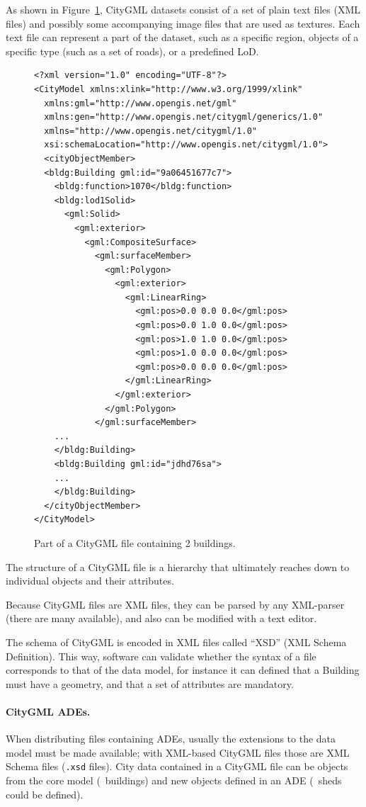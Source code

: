As shown in Figure~\ref{fig:citygml_file}, CityGML datasets consist of a set of plain text files (XML files) and possibly some accompanying image files that are used as textures. 
Each text file can represent a part of the dataset, such as a specific region, objects of a specific type (such as a set of roads), or a predefined LoD\@.
\begin{figure}
\begin{lstlisting}
<?xml version="1.0" encoding="UTF-8"?>
<CityModel xmlns:xlink="http://www.w3.org/1999/xlink" 
  xmlns:gml="http://www.opengis.net/gml" 
  xmlns:gen="http://www.opengis.net/citygml/generics/1.0" 
  xmlns="http://www.opengis.net/citygml/1.0" 
  xsi:schemaLocation="http://www.opengis.net/citygml/1.0">
  <cityObjectMember>
  <bldg:Building gml:id="9a06451677c7">
    <bldg:function>1070</bldg:function>
    <bldg:lod1Solid>
      <gml:Solid>
        <gml:exterior>
          <gml:CompositeSurface>
            <gml:surfaceMember>
              <gml:Polygon>
                <gml:exterior>
                  <gml:LinearRing>
                    <gml:pos>0.0 0.0 0.0</gml:pos>
                    <gml:pos>0.0 1.0 0.0</gml:pos>
                    <gml:pos>1.0 1.0 0.0</gml:pos>
                    <gml:pos>1.0 0.0 0.0</gml:pos>
                    <gml:pos>0.0 0.0 0.0</gml:pos>
                  </gml:LinearRing>
                </gml:exterior>
              </gml:Polygon>
            </gml:surfaceMember>
    ...
    </bldg:Building>
    <bldg:Building gml:id="jdhd76sa">
    ...
    </bldg:Building>
  </cityObjectMember>
</CityModel>
\end{lstlisting}
\caption{Part of a CityGML file containing 2 buildings.}%
\label{fig:citygml_file}
\end{figure}
The structure of a CityGML file is a hierarchy that ultimately reaches down to individual objects and their attributes. 

Because CityGML files are XML files, they can be parsed by any XML-parser (there are many available), and also can be modified with a text editor.

The schema of CityGML is encoded in XML files called ``XSD'' (XML Schema Definition).
This way, software can validate whether the syntax of a file corresponds to that of the data model, for instance it can defined that a Building must have a geometry, and that a set of attributes are mandatory.

\paragraph*{CityGML ADEs.}
When distributing files containing ADEs, usually the extensions to the data model must be made available; with XML-based CityGML files those are XML Schema files (\texttt{.xsd} files).
City data contained in a CityGML file can be objects from the core model (\eg\ buildings) and new objects defined in an ADE (\eg\ sheds could be defined).


